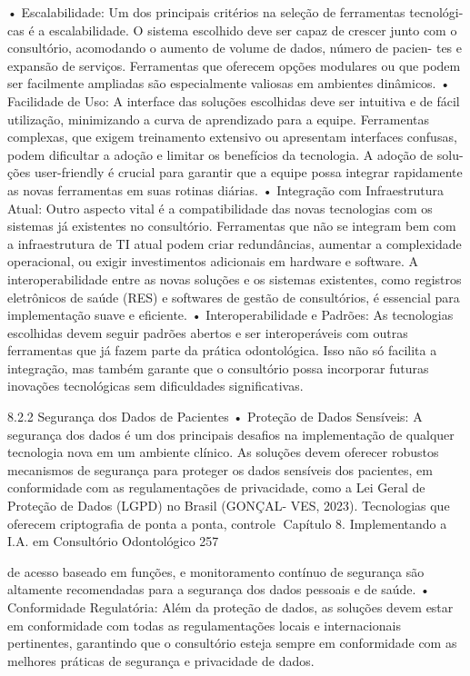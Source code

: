     • Escalabilidade: Um dos principais critérios na seleção de ferramentas tecnológi-
      cas é a escalabilidade. O sistema escolhido deve ser capaz de crescer junto com
      o consultório, acomodando o aumento de volume de dados, número de pacien-
      tes e expansão de serviços. Ferramentas que oferecem opções modulares ou
      que podem ser facilmente ampliadas são especialmente valiosas em ambientes
      dinâmicos.
    • Facilidade de Uso: A interface das soluções escolhidas deve ser intuitiva e de
      fácil utilização, minimizando a curva de aprendizado para a equipe. Ferramentas
      complexas, que exigem treinamento extensivo ou apresentam interfaces confusas,
      podem dificultar a adoção e limitar os benefícios da tecnologia. A adoção de solu-
      ções user-friendly é crucial para garantir que a equipe possa integrar rapidamente
      as novas ferramentas em suas rotinas diárias.
    • Integração com Infraestrutura Atual: Outro aspecto vital é a compatibilidade das
      novas tecnologias com os sistemas já existentes no consultório. Ferramentas que
      não se integram bem com a infraestrutura de TI atual podem criar redundâncias,
      aumentar a complexidade operacional, ou exigir investimentos adicionais em
      hardware e software. A interoperabilidade entre as novas soluções e os sistemas
      existentes, como registros eletrônicos de saúde (RES) e softwares de gestão de
      consultórios, é essencial para implementação suave e eficiente.
    • Interoperabilidade e Padrões: As tecnologias escolhidas devem seguir padrões
      abertos e ser interoperáveis com outras ferramentas que já fazem parte da prática
      odontológica. Isso não só facilita a integração, mas também garante que o
      consultório possa incorporar futuras inovações tecnológicas sem dificuldades
      significativas.

8.2.2    Segurança dos Dados de Pacientes
    • Proteção de Dados Sensíveis: A segurança dos dados é um dos principais
      desafios na implementação de qualquer tecnologia nova em um ambiente clínico.
      As soluções devem oferecer robustos mecanismos de segurança para proteger
      os dados sensíveis dos pacientes, em conformidade com as regulamentações de
      privacidade, como a Lei Geral de Proteção de Dados (LGPD) no Brasil (GONÇAL-
      VES, 2023). Tecnologias que oferecem criptografia de ponta a ponta, controle
Capítulo 8. Implementando a I.A. em Consultório Odontológico                        257


      de acesso baseado em funções, e monitoramento contínuo de segurança são
      altamente recomendadas para a segurança dos dados pessoais e de saúde.
    • Conformidade Regulatória: Além da proteção de dados, as soluções devem
      estar em conformidade com todas as regulamentações locais e internacionais
      pertinentes, garantindo que o consultório esteja sempre em conformidade com as
      melhores práticas de segurança e privacidade de dados.

